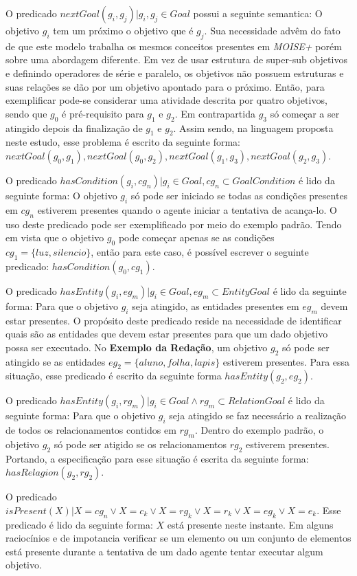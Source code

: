 O predicado $nextGoal(g_i,g_j) |g_i, g_j \in Goal$ possui a seguinte semantica: O objetivo $g_i$ tem um próximo o objetivo que 
é $g_j$. Sua necessidade advêm do fato de que este modelo trabalha os mesmos conceitos presentes em \textit{MOISE+} porém sobre
uma abordagem diferente. Em vez de usar estrutura de super-sub objetivos e definindo operadores de série e paralelo, os objetivos 
não possuem estruturas e suas relações se dão por um objetivo apontado para o próximo. Então, para exemplificar pode-se 
considerar uma atividade descrita por quatro objetivos, sendo que $g_0$ é pré-requisito para $g_1$ e $g_2$. Em contrapartida
$g_3$ só começar a ser atingido depois da finalização de $g_1$ e $g_2$. Assim sendo, na linguagem proposta neste estudo, 
esse problema é escrito da seguinte forma: $nextGoal(g_0,g_1), nextGoal(g_0,g_2), nextGoal(g_1,g_3), nextGoal(g_2,g_3)$.

O predicado $hasCondition(g_i,cg_n) | g_i \in Goal, cg_n \subset GoalCondition$ é lido da seguinte forma: O objetivo $g_i$ só pode 
ser iniciado se todas as condições presentes em $cg_n$ estiverem presentes quando o agente iniciar a tentativa de acança-lo. 
O uso deste predicado pode ser exemplificado por meio do exemplo padrão. Tendo em vista que o objetivo $g_0$ pode começar apenas 
se as condições $cg_1 = \{ luz, silencio \}$, então para este caso, é possível escrever o seguinte predicado: $hasCondition(g_0,cg_1)$.

O predicado $hasEntity(g_i,eg_m) | g_i \in Goal, eg_m \subset EntityGoal $ é lido da seguinte forma: Para que o objetivo $g_i$ seja atingido, as entidades presentes em 
$eg_m$ devem estar presentes. O propósito deste predicado reside na necessidade de identificar quais são as entidades que devem 
estar presentes para que um dado objetivo possa ser executado. No \textbf{Exemplo da Redação}, um objetivo $g_2$ só pode ser 
atingido se as entidades $eg_2 = \{ aluno, folha, lapis\}$ estiverem presentes. Para essa situação, esse predicado é escrito da 
seguinte forma $hasEntity(g_2,eg_2)$.

O predicado $hasEntity(g_i,rg_m) | g_i \in Goal \wedge rg_m \subset RelationGoal $ é lido da seguinte forma: Para que o objetivo $g_i$
seja atingido se faz necessário a realização de todos os relacionamentos contidos em $rg_m$. Dentro do exemplo padrão, o objetivo 
$g_2$ só pode ser atigido se os relacionamentos $rg_2$ estiverem presentes. Portando, a especificação para esse situação é escrita
da seguinte forma: $hasRelagion(g_2,rg_2)$.

O predicado $isPresent(X) | X = cg_n \vee X = c_k \vee  X = rg_k \vee X = r_k \vee X = eg_k \vee X = e_k $. Esse predicado é lido 
da seguinte forma: $X$ está presente neste instante. Em alguns raciocínios e de impotancia verificar se um elemento ou um conjunto
de elementos está presente durante a tentativa de um dado agente tentar executar algum objetivo.

